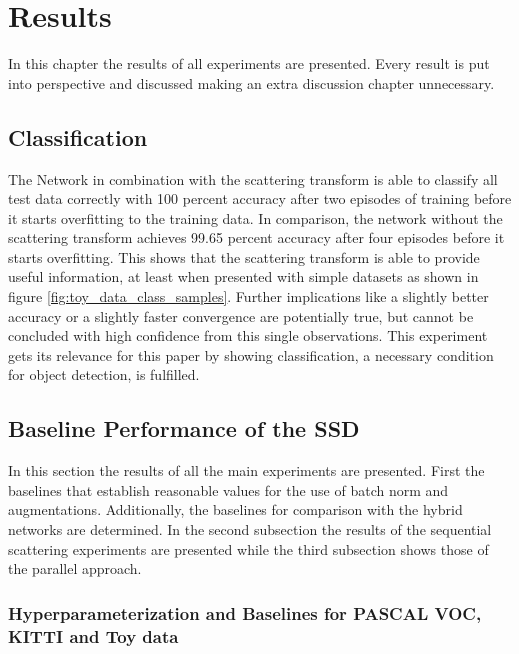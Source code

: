 \chapter{Results}
\label{chap:results}

In this chapter the results of all experiments are presented. Every result is put into perspective and discussed making an extra discussion chapter unnecessary.

\section{Classification}

The Network in combination with the scattering transform is able to classify all test data correctly with 100 percent accuracy after two episodes of training before it starts overfitting to the training data. In comparison, the network without the scattering transform achieves 99.65 percent accuracy after four episodes before it starts overfitting. This shows that the scattering transform is able to provide useful information, at least when presented with simple datasets as shown in figure \ref{fig:toy_data_class_samples}. Further implications like a slightly better accuracy or a slightly faster convergence are potentially true, but cannot be concluded with high confidence from this single observations. This experiment gets its relevance for this paper by showing classification, a necessary condition for object detection, is fulfilled.

\section{Baseline Performance of the SSD}

In this section the results of all the main experiments are presented. First the baselines that establish reasonable values for the use of batch norm and augmentations. Additionally, the baselines for comparison with the hybrid networks are determined. In the second subsection the results of the sequential scattering experiments are presented while the third subsection shows those of the parallel approach.

\subsection{Hyperparameterization and Baselines for PASCAL VOC, KITTI and Toy data}

